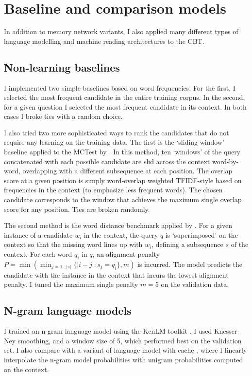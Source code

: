 \section{Baseline and comparison models}


In addition to memory network variants, I also applied many different types of
 language modelling and machine reading architectures to the CBT.

\subsection{Non-learning baselines}
I implemented two simple baselines based on word frequencies. For the first, I selected the most frequent candidate in the entire training corpus. In the second, for a given question I selected the most frequent candidate in its context. In both cases I broke ties with a random choice. 

I also tried two more sophisticated ways to rank the candidates that do not require any learning on the training data. The first is the `sliding window' baseline applied to the MCTest by \cite{richardson2013mctest}. In this method, ten `windows' of the query concatenated with each possible candidate are slid across the context word-by-word, overlapping with a different subsequence at each position. The overlap score at a given position is simply word-overlap weighted TFIDF-style based on frequencies in the context (to emphasize less frequent words). The chosen candidate corresponds to the window that achieves the maximum single overlap score for any position. Ties are broken randomly. 

The second method is the word distance benchmark applied by \cite{nips15_hermann}. For a given instance of a candidate \(w_i\) in the context, the query \(q\) is `superimposed' on the context so that the missing word lines up with \(w_i\), defining a subsequence \(s\) of the context. For each word \(q_i\) in \(q\), an alignment penalty $P = \min( \min_{j = 1 \dots |s|} \{|i - j| : s_j = q_i\}, m)$ is incurred. The model predicts the candidate with the instance in the context that incurs the lowest alignment penalty. I tuned the maximum single penalty \(m=5\)  on the validation data.  

\subsection{N-gram language models}
I trained an n-gram language model using the KenLM toolkit \citep{Heafield-estimate}. I used Knesser-Ney smoothing, and a window size of 5, which performed best on the validation set.
%
I also compare with a variant of language model with cache \citep{kuhn1990cache}, where I linearly interpolate the n-gram model probabilities with unigram probabilities computed on the context.

